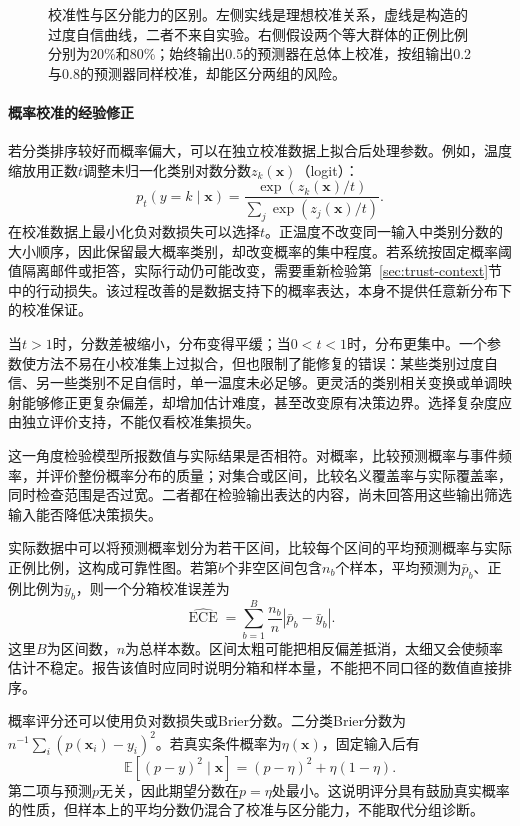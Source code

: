 \begin{figure}[t]
  \centering
  
  \caption{校准性与区分能力的区别。左侧实线是理想校准关系，虚线是构造的过度自信曲线，二者不来自实验。右侧假设两个等大群体的正例比例分别为20\%和80\%；始终输出0.5的预测器在总体上校准，按组输出0.2与0.8的预测器同样校准，却能区分两组的风险。}
  \label{fig:trust-calibration-discrimination}
\end{figure}
\FloatBarrier

\paragraph{概率校准的经验修正}

若分类排序较好而概率偏大，可以在独立校准数据上拟合后处理参数。例如，温度缩放用正数$t$调整未归一化类别对数分数$z_k(\bm{x})$（logit）：
\[
 p_t(y=k\mid\bm{x})
 =\frac{\exp(z_k(\bm{x})/t)}
        {\sum_j\exp(z_j(\bm{x})/t)}.
\]
在校准数据上最小化负对数损失可以选择$t$。正温度不改变同一输入中类别分数的大小顺序，因此保留最大概率类别，却改变概率的集中程度。若系统按固定概率阈值隔离邮件或拒答，实际行动仍可能改变，需要重新检验第~\ref{sec:trust-context}节中的行动损失。该过程改善的是数据支持下的概率表达，本身不提供任意新分布下的校准保证。

当$t>1$时，分数差被缩小，分布变得平缓；当$0<t<1$时，分布更集中。一个参数使方法不易在小校准集上过拟合，但也限制了能修复的错误：某些类别过度自信、另一些类别不足自信时，单一温度未必足够。更灵活的类别相关变换或单调映射能够修正更复杂偏差，却增加估计难度，甚至改变原有决策边界。选择复杂度应由独立评价支持，不能仅看校准集损失。

这一角度检验模型所报数值与实际结果是否相符。对概率，比较预测概率与事件频率，并评价整份概率分布的质量；对集合或区间，比较名义覆盖率与实际覆盖率，同时检查范围是否过宽。二者都在检验输出表达的内容，尚未回答用这些输出筛选输入能否降低决策损失。

实际数据中可以将预测概率划分为若干区间，比较每个区间的平均预测概率与实际正例比例，这构成可靠性图。若第$b$个非空区间包含$n_b$个样本，平均预测为$\bar p_b$、正例比例为$\bar y_b$，则一个分箱校准误差为
\begin{equation}
 \widehat{\operatorname{ECE}}
 =\sum_{b=1}^{B}\frac{n_b}{n}
       |\bar p_b-\bar y_b|.
 \label{eq:reliability-ece}
\end{equation}
这里$B$为区间数，$n$为总样本数。区间太粗可能把相反偏差抵消，太细又会使频率估计不稳定。报告该值时应同时说明分箱和样本量，不能把不同口径的数值直接排序。

概率评分还可以使用负对数损失或Brier分数。二分类Brier分数为$n^{-1}\sum_i(p(\bm{x}_i)-y_i)^2$。若真实条件概率为$\eta(\bm{x})$，固定输入后有
\[
 \mathbb E[(p-y)^2\mid\bm{x}]
 =(p-\eta)^2+\eta(1-\eta).
\]
第二项与预测$p$无关，因此期望分数在$p=\eta$处最小。这说明评分具有鼓励真实概率的性质，但样本上的平均分数仍混合了校准与区分能力，不能取代分组诊断。

